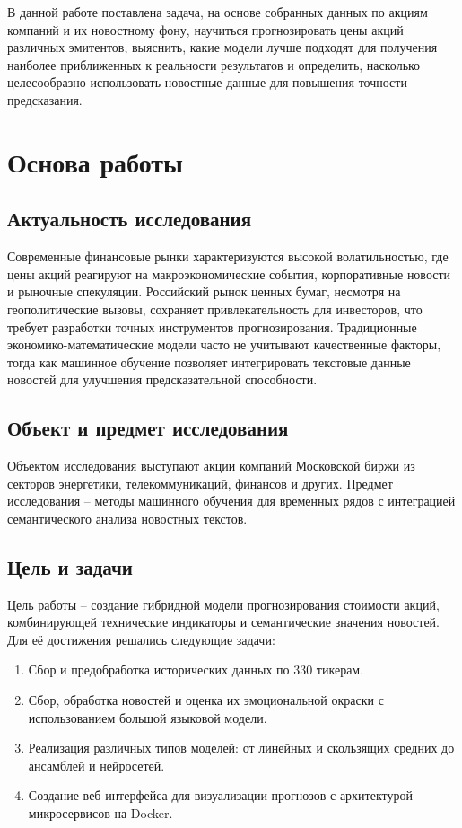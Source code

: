 \documentclass[12pt, a4paper]{article}
\begin{document}
В данной работе поставлена задача, на основе собранных данных по акциям компаний и их новостному фону, научиться прогнозировать цены акций различных эмитентов, выяснить, какие модели лучше подходят для получения наиболее приближенных к реальности результатов и определить, насколько целесообразно использовать новостные данные для повышения точности предсказания.

\section{Основа работы}

\subsection{Актуальность исследования}
Современные финансовые рынки характеризуются высокой волатильностью, где цены акций реагируют на макроэкономические события, корпоративные новости и рыночные спекуляции. Российский рынок ценных бумаг, несмотря на геополитические вызовы, сохраняет привлекательность для инвесторов, что требует разработки точных инструментов прогнозирования. Традиционные экономико-математические модели часто не учитывают качественные факторы, тогда как машинное обучение позволяет интегрировать текстовые данные новостей для улучшения предсказательной способности. 

\subsection{Объект и предмет исследования}
Объектом исследования выступают акции компаний Московской биржи из секторов энергетики, телекоммуникаций, финансов и других. Предмет исследования – методы машинного обучения для временных рядов с интеграцией семантического анализа новостных текстов.

\subsection{Цель и задачи}
Цель работы – создание гибридной модели прогнозирования стоимости акций, комбинирующей технические индикаторы и семантические значения новостей. Для её достижения решались следующие задачи:

\begin{enumerate}
  \item Сбор и предобработка исторических данных по 330 тикерам.

  \item Сбор, обработка новостей и оценка их эмоциональной окраски с использованием большой языковой модели.

  \item Реализация различных типов моделей: от линейных и скользящих средних до ансамблей и нейросетей.

  \item Создание веб-интерфейса для визуализации прогнозов с архитектурой микросервисов на Docker.
\end{enumerate}
\end{document}
